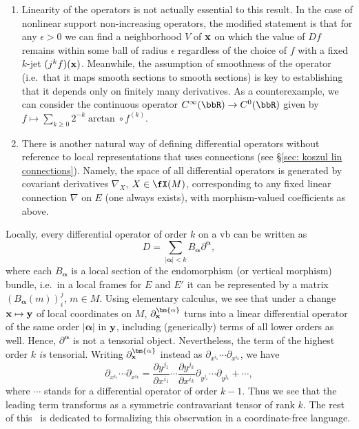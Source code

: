 \begin{rem}
    \begin{enumerate}
        \item Linearity of the operators is not actually essential to this result. In the case of nonlinear support non-increasing operators, the modified statement is that for any $\epsilon>0$ we can find a neighborhood $V$ of $\bf{x}$ on which the value of $Df$ remains within some ball of radius $\epsilon$ regardless of the choice of $f$ with a fixed $k$-jet $(j^kf)(\bf{x})$. Meanwhile, the assumption of smoothness of the operator (i.e.\ that it maps smooth sections to smooth sections) is key to establishing that it depends only on finitely many derivatives. As a counterexample, we can consider the continuous operator $C^\infty(\bbR)\to C^0(\bbR)$ given by $f\mapsto \sum_{k\geq 0} 2^{-k}\arctan\circ f^{(k)}$.
        \item There is another natural way of defining differential operators without reference to local representations that uses connections (see \S\ref{sec: koszul lin connections}). Namely, the space of all differential operators is generated by covariant derivatives $\nabla_X$, $X\in\fX(M)$, corresponding to any fixed linear connection $\nabla$ on $E$ (one always exists), with morphism-valued coefficients as above.
    \end{enumerate}
\end{rem}

Locally, every differential operator of order $k$ on a \gls{vb} can be written as 
\[D=\sum_{|\bm{\alpha}|<k}B_{\bm{\alpha}}\partial^{\bm{\alpha}},\]
where each $B_{\bm{\alpha}}$ is a local section of the endomorphism (or vertical morphism) bundle, i.e.\ in a local frames for $E$ and $E'$ it can be represented by a matrix $(B_{\bm{\alpha}}(m))_i^j$, $m\in M$. Using elementary calculus,  we see that under a change $\bf{x}\mapsto \bf{y}$ of local coordinates on $M$, $\partial^{\bm{\alpha}}_{\bf{x}}$ turns into a linear differential operator of the same order $|\bm{\alpha}|$ in $\bf{y}$, including (generically) terms of all lower orders as well. Hence, $\partial^{\bm{\alpha}}$ is not a tensorial object. Nevertheless, the term of the highest order $k$ \emph{is} tensorial. Writing $\partial^{\bm{\alpha}}_{\bf{x}}$ instead as $\partial_{x^{i_1}}\cdots \partial_{x^{i_k}}$, we have 
\[\partial_{x^{i_1}}\cdots \partial_{x^{i_k}}=\frac{\partial y^{j_1}}{\partial x^{i_1}}\cdots \frac{\partial y^{j_k}}{\partial x^{i_k}}\partial_{y^{j_1}}\cdots \partial_{y^{j_k}}+\cdots ,\]
where $\cdots$ stands for a differential operator of order $k-1$. Thus we see that the leading term transforms as a symmetric contravariant tensor of rank $k$. The rest of this \subsect\ is dedicated to formalizing this observation in a coordinate-free language.

